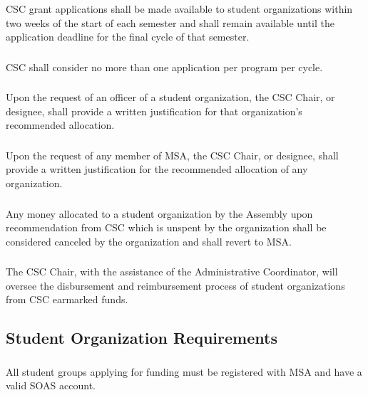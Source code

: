 \subsubsection{}
CSC grant applications shall be made available to student organizations within two weeks of the start of each semester and shall remain available until the application deadline for the final cycle of that semester.
\subsubsection{}
CSC shall consider no more than one application per program per cycle.
\subsubsection{}
Upon the request of an officer of a student organization, the CSC Chair, or designee, shall provide a written justification for that organization's recommended allocation.
\subsubsection{}
Upon the request of any member of MSA, the CSC Chair, or designee, shall provide a written justification for the recommended allocation of any organization. 
\subsubsection{}
Any money allocated to a student organization by the Assembly upon recommendation from CSC which is unspent by the organization shall be considered canceled by the organization and shall revert to MSA.
\subsubsection{}
The CSC Chair, with the assistance of the Administrative Coordinator, will oversee the disbursement and reimbursement process of student organizations from CSC earmarked funds.


\subsection{Student Organization Requirements}

\subsubsection{}
All student groups applying for funding must be registered with MSA and have a valid SOAS account.

